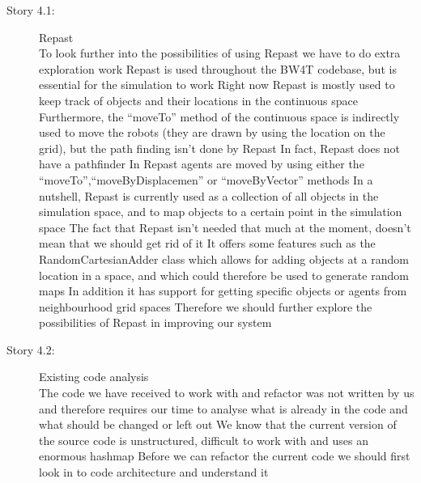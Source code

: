 \begin{description}
\item[Story 4.1:] Repast\\
To look further into the possibilities of using Repast we have to do extra exploration work
Repast is used throughout the BW4T codebase, but is essential for the simulation to work
Right now Repast is mostly used to keep track of objects and their locations in the continuous space
Furthermore, the ``moveTo'' method of the continuous space is indirectly used to move the robots (they are drawn by using the location on the grid), but the path finding isn't done by Repast
In fact, Repast does not have a pathfinder
In Repast agents are moved by using either the ``moveTo'',``moveByDisplacemen'' or ``moveByVector'' methods
In a nutshell, Repast is currently used as a collection of all objects in the simulation space, and to map objects to a certain point in the simulation space
The fact that Repast isn't needed that much at the moment, doesn't mean that we should get rid of it
It offers some features such as the RandomCartesianAdder class which allows for adding objects at a random location in a space, and which could therefore be used to generate random maps
In addition it has support for getting specific objects or agents from neighbourhood grid spaces
Therefore we should further explore the possibilities of Repast in improving our system
\end{description}

\begin{description}
\item[Story 4.2:] Existing code analysis\\
The code we have received to work with and refactor was not written by us and therefore requires our time to analyse what is already in the code and what should be changed or left out
We know that the current version of the source code is unstructured, difficult to work with and uses an enormous hashmap
Before we can refactor the current code we should first look in to code architecture and understand it
\end{description}